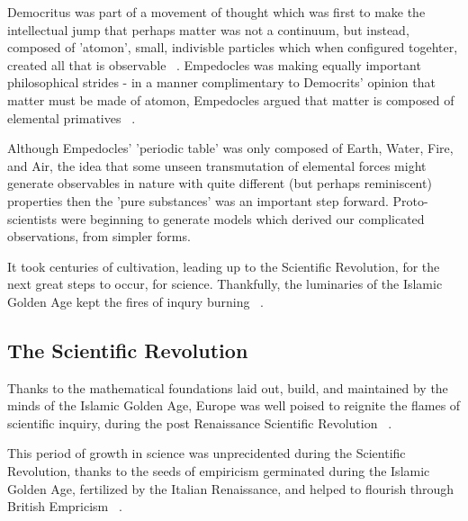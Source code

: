 Democritus was part of a movement of thought which was first to make the
intellectual jump that perhaps matter was not a continuum, but instead, composed
of 'atomon', small, indivisble particles which when configured togehter, created
all that is observable ~\needcite{}. Empedocles was making equally important
philosophical strides - in a manner complimentary to Democrits' opinion that
matter must be made of atomon, Empedocles argued that matter is composed of
elemental primatives ~\needcite{}.

Although Empedocles' 'periodic table' was only composed of Earth, Water, Fire,
and Air, the idea that some unseen transmutation of elemental forces might
generate observables in nature with quite different (but perhaps reminiscent)
properties then the 'pure substances' was an important step forward.
Proto-scientists were beginning to generate models which derived our complicated
observations, from simpler forms.

It took centuries of cultivation, leading up to the Scientific Revolution, for
the next great steps to occur, for science. Thankfully, the luminaries of the
Islamic Golden Age kept the fires of inqury burning ~\needcite{}.

\subsection{The Scientific Revolution}

Thanks to the mathematical foundations laid out, build, and maintained by the
minds of the Islamic Golden Age, Europe was well poised to reignite the flames
of scientific inquiry, during the post Renaissance Scientific Revolution
~\needcite{}.

This period of growth in science was unprecidented during the Scientific
Revolution, thanks to the seeds of empiricism germinated during the Islamic
Golden Age, fertilized by the Italian Renaissance, and helped to flourish
through British Empricism ~\needcite{}.

